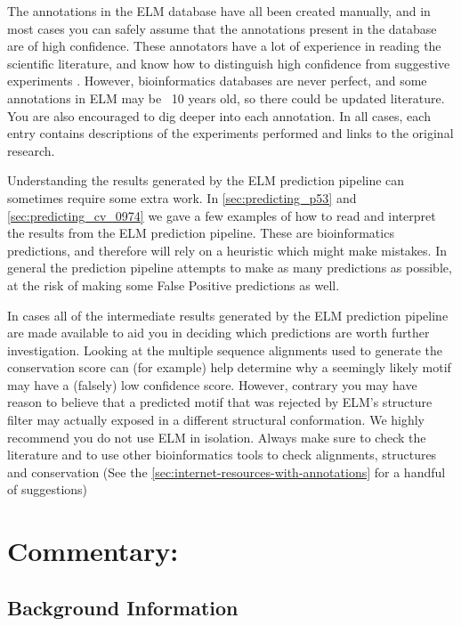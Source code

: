 \documentclass[12pt]{article}
\begin{document}
The annotations in the ELM database have all been created manually, and in most cases
you can safely assume that the annotations present in the database are of
high confidence.
These annotators have a lot of experience in reading the scientific literature,
and know how to distinguish high confidence from suggestive experiments
\cite{26581338}.
However, bioinformatics databases are never perfect, and some annotations in
ELM may be ~10 years old, so there could be updated literature.
You are also encouraged to dig deeper into each annotation.
In all cases, each entry contains descriptions of the experiments performed and
links to the original research.

Understanding the results generated by the ELM prediction pipeline
can sometimes require some extra work.
In \ref{sec:predicting_p53} and \ref{sec:predicting_cv_0974} we gave a few
examples of how to read and interpret the results from the ELM prediction
pipeline.
These are bioinformatics predictions, and therefore will rely
on a heuristic which might make mistakes.
In general the  prediction pipeline attempts to make as many predictions as
possible, at the risk of making some False Positive predictions as well.

In cases all of the intermediate results generated by the ELM prediction
pipeline are made available to aid you in deciding which predictions are worth
further investigation.
Looking at the multiple sequence alignments used to generate the conservation
score can (for example) help determine why a seemingly likely motif may have a
(falsely) low confidence score.
However, contrary you may have reason to believe that a predicted motif that was
rejected by ELM's structure filter may actually exposed in a different
structural conformation.
We highly recommend you do not use ELM in isolation. Always make sure to check
the literature and to use other bioinformatics tools to check alignments, structures and conservation (See the \ref{sec:internet-resources-with-annotations} for a handful of suggestions)

\section*{Commentary:}\label{commentary}

\subsection*{Background Information}\label{background-information}
\end{document}
